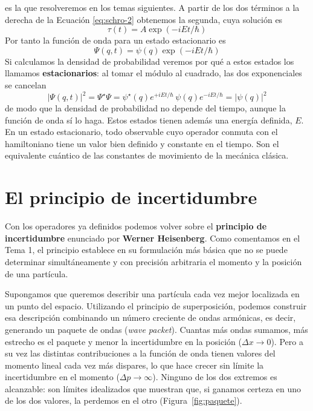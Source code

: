 \documentclass{tufte-handout}
\begin{document}
es la que resolveremos en los temas
siguientes.
A partir de los dos términos a la derecha de la Ecuación
\ref{eq:schro-2} obtenemos la segunda, cuya solución es
\begin{equation}
    \tau(t)=A\exp(-iEt/\hbar)
    \label{eq:tau-t}
\end{equation}
Por tanto la función de onda para un estado estacionario
es
\begin{equation}
    \Psi(q,t)=\psi(q)\exp(-iEt/\hbar)
    \label{eq:estacionario}
\end{equation}
Si calculamos la densidad de probabilidad veremos por qué a
estos estados los llamamos \textbf{estacionarios}: al tomar
el módulo al cuadrado, las dos exponenciales se cancelan
\begin{equation}
    |\Psi(q,t)|^2=\Psi^\star\Psi=
    \psi^\star(q)e^{+iEt/\hbar}\,\psi(q)e^{-iEt/\hbar}=
    |\psi(q)|^2
    \label{eq:densidad-estacionaria}
\end{equation}
de modo que la densidad de probabilidad no depende del
tiempo, aunque la función de onda sí lo haga.
Estos estados tienen además una energía definida, $E$.
En un estado estacionario, todo observable cuyo operador
conmuta con el hamiltoniano tiene un valor bien definido y
constante en el tiempo. Son el equivalente cuántico de las
constantes de movimiento de la mecánica clásica.

\section{El principio de incertidumbre}
Con los operadores ya definidos podemos volver sobre el
\textbf{principio de incertidumbre} enunciado por
\textbf{Werner Heisenberg}. Como comentamos en el Tema 1,
el principio establece en su formulación más básica que no
se puede determinar simultáneamente y con precisión
arbitraria el momento y la posición de una partícula. 

Supongamos que queremos describir una partícula cada vez
mejor localizada en un punto del espacio. Utilizando el
principio de superposición, podemos construir esa
descripción combinando un número creciente de ondas 
armónicas, es decir, generando un paquete de
ondas (\textit{wave packet}). Cuantas más ondas sumamos,
más estrecho es el paquete y menor la incertidumbre en la
posición ($\Delta x\rightarrow 0$).
Pero a su vez las distintas contribuciones a la función 
de onda tienen valores del momento lineal cada vez más
dispares, lo que hace crecer sin límite la incertidumbre en
el momento ($\Delta p\rightarrow\infty$). Ninguno de los dos
extremos es alcanzable: son límites idealizados que
muestran que, si ganamos certeza en uno de los dos valores,
la perdemos en el otro (Figura~\ref{fig:paquete}).
\end{document}
